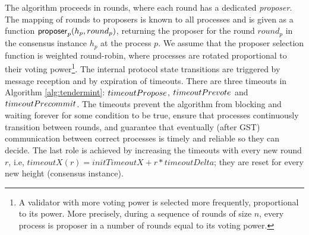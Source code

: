 The algorithm proceeds in rounds, where each round has a dedicated
\emph{proposer}. The mapping of rounds to proposers is known to all processes
and is given as a function $\mathsf{proposer}_p(h_p, round_p)$, returning the proposer for
the round $round_p$ in the consensus instance $h_p$ at the process $p$. We
assume that the proposer selection function is weighted round-robin, where
processes are rotated proportional to their voting power\footnote{A validator
with more voting power is selected more frequently, proportional to its power.
More precisely, during a sequence of rounds of size $n$, every process is
proposer in a number of rounds equal to its voting power.}. 
The internal protocol state transitions are triggered by message reception and 
by expiration of timeouts. There are three timeouts in Algorithm \ref{alg:tendermint}:
$timeoutPropose$, $timeoutPrevote$ and $timeoutPrecommit$.
The timeouts prevent the algorithm from blocking and
waiting forever for some condition to be true, ensure that processes continuously 
transition between rounds, and guarantee that eventually (after GST) communication 
between correct processes is timely and reliable so they can decide. 
The last role is achieved by increasing the timeouts with every new round $r$, 
i.e, $timeoutX(r) = initTimeoutX + r*timeoutDelta$; 
they are reset for every new height (consensus
instance). 

